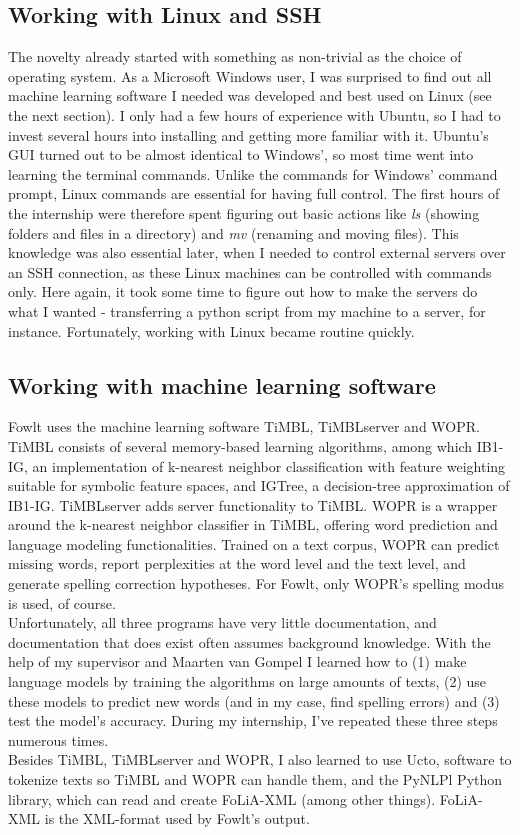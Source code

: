 \documentclass[12pt]{article}
\begin{document}
\subsection{Working with Linux and SSH}
The novelty already started with something as non-trivial as the choice of operating system. As a Microsoft Windows user, I was surprised to find out all machine learning software I needed was developed and best used on Linux (see the next section). I only had a few hours of experience with Ubuntu, so I had to invest several hours into installing and getting more familiar with it. Ubuntu's GUI turned out to be almost identical to Windows', so most time went into learning the terminal commands. Unlike the commands for Windows' command prompt, Linux commands are essential for having full control. The first hours of the internship were therefore spent figuring out basic actions like \emph{ls} (showing folders and files in a directory) and \emph{mv} (renaming and moving files). This knowledge was also essential later, when I needed to control external servers over an SSH connection, as these Linux machines can be controlled with commands only. Here again, it took some time to figure out how to make the servers do what I wanted - transferring a python script from my machine to a server, for instance. Fortunately, working with Linux became routine quickly.

\subsection{Working with machine learning software}
Fowlt uses the machine learning software TiMBL, TiMBLserver and WOPR. TiMBL consists of several memory-based learning algorithms, among which IB1-IG, an implementation of k-nearest neighbor classification with feature weighting suitable for symbolic feature spaces, and IGTree, a decision-tree approximation of IB1-IG. TiMBLserver adds server functionality to TiMBL. WOPR is a wrapper around the k-nearest neighbor classifier in TiMBL, offering word prediction and language modeling functionalities. Trained on a text corpus, WOPR can predict missing words, report perplexities at the word level and the text level, and generate spelling correction hypotheses. For Fowlt, only WOPR's spelling modus is used, of course.
\\\indent
Unfortunately, all three programs have very little documentation, and documentation that does exist often assumes background knowledge. With the help of my supervisor and Maarten van Gompel I learned how to (1) make language models by training the algorithms on large amounts of texts, (2) use these models to predict new words (and in my case, find spelling errors) and (3) test the model's accuracy. During my internship, I've repeated these three steps numerous times.
\\\indent
Besides TiMBL, TiMBLserver and WOPR, I also learned to use Ucto, software to tokenize texts so TiMBL and WOPR can handle them, and the PyNLPl Python library, which can read and create FoLiA-XML (among other things). FoLiA-XML is the XML-format used by Fowlt's output.
\end{document}
